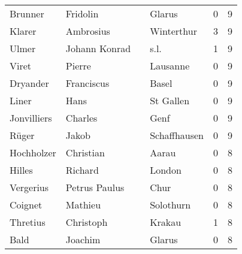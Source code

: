 \documentclass[10pt,a4paper,landscape]{article}
\begin{document}
\begin{longtable}{llllrr}
                  Brunner &                           Fridolin &             &                                      Glarus &          0 &         9 \\
                   Klarer &                          Ambrosius &             &                                  Winterthur &          3 &         9 \\
                    Ulmer &                      Johann Konrad &             &                                        s.l. &          1 &         9 \\
                    Viret &                             Pierre &             &                                    Lausanne &          0 &         9 \\
                 Dryander &                         Franciscus &             &                                       Basel &          0 &         9 \\
                    Liner &                               Hans &             &                                   St Gallen &          0 &         9 \\
              Jonvilliers &                            Charles &             &                                        Genf &          0 &         9 \\
                    Rüger &                              Jakob &             &                                Schaffhausen &          0 &         9 \\
               Hochholzer &                          Christian &             &                                       Aarau &          0 &         8 \\
                   Hilles &                            Richard &             &                                      London &          0 &         8 \\
                Vergerius &                      Petrus Paulus &             &                                        Chur &          0 &         8 \\
                  Coignet &                            Mathieu &             &                                   Solothurn &          0 &         8 \\
                 Thretius &                          Christoph &             &                                      Krakau &          1 &         8 \\
                     Bald &                            Joachim &             &                                      Glarus &          0 &         8 \\

\end{longtable}
\end{document}
